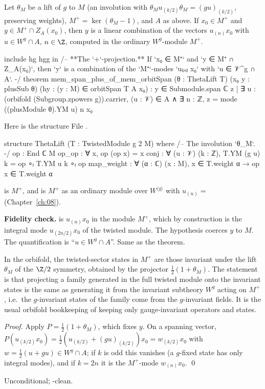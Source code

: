 \begin{theorem}\label{ch11:thm:plusproj}
Let $\theta_M$ be a lift of $g$ to $M$ (an involution with $\theta_M u_{(k/2)}\theta_M=(gu)_{(k/2)}$,
preserving weights), $M^+=\ker(\theta_M-1)$, and $A$ as above.  If $x_0\in M^+$ and $y\in M^+\cap
Z_A(x_0)$, then $y$ is a linear combination of the vectors $u_{(n)}x_0$ with $u\in W^g\cap A$, $n\in\Z$,
computed in the ordinary $W^g$-module $M^+$.
\end{theorem}
\begin{leancode}
include hg hgg in
/-- **The `+`-projection.**  If `x₀ ∈ M⁺` and `y ∈ M⁺ ∩ Z_A(x₀)`, then `y` is a combination of
the `M⁺`-modes `u₍ₙ₎ x₀` with `u ∈ 𝒱^g ∩ A`. -/
theorem mem_span_plus_of_mem_orbitSpan (θ : ThetaLift T) (x₀ y : plusSub θ)
    (hy : (y : M) ∈ orbitSpan T A x₀) :
    y ∈ Submodule.span ℂ {z | ∃ u : (orbifold (Subgroup.zpowers g)).carrier, (u : 𝒱) ∈ A ∧
      ∃ n : ℤ, z = mode ((plusModule θ).YM u) n x₀}
\end{leancode}
Here  is the structure
\noindent File .
\begin{leancode}
structure ThetaLift (T : TwistedModule g 2 M) where
  /-- The involution `θ_M`. -/
  op : End ℂ M
  op_op : ∀ x, op (op x) = x
  conj : ∀ (u : 𝒱) (k : ℤ), T.YM (g u) k = op ∘ₗ T.YM u k ∘ₗ op
  map_weight : ∀ (α : ℂ) (x : M), x ∈ T.weight α → op x ∈ T.weight α
\end{leancode}
 is $M^+$, and  is $M^+$ as
an ordinary module over $W^{\langle g\rangle}$ with $u_{(n)}=$  (Chapter~\ref{ch:08}).
\begin{dictionary}
\textbf{Fidelity check.}   is $u_{(n)}x_0$ in the module
$M^+$, which by construction is the integral mode $u_{(2n/2)}x_0$ of the twisted module.  The
hypothesis  coerces $y$ to $M$.  The quantification  is ``$u\in W^g\cap A$''.  Same as the theorem.
\end{dictionary}

\begin{physics}
In the orbifold, the twisted-sector states in $M^+$ are those invariant under the lift $\theta_M$ of the $\Z/2$ symmetry, obtained by the projector $\tfrac12(1+\theta_M)$. The statement is that projecting a family generated in the full twisted module onto the invariant states is the same as generating it from the invariant subtheory $W^g$ acting on $M^+$, i.e.\ the $g$-invariant states of the family come from the $g$-invariant fields. It is the usual orbifold bookkeeping of keeping only gauge-invariant operators and states.
\end{physics}
\emph{Proof.}  Apply $P=\tfrac12(1+\theta_M)$, which fixes $y$.  On a spanning vector,
$P(u_{(k/2)}x_0)=\tfrac12(u_{(k/2)}+(gu)_{(k/2)})x_0=w_{(k/2)}x_0$ with $w=\tfrac12(u+gu)\in W^g\cap A$;
if $k$ is odd this vanishes (a $g$-fixed state has only integral modes), and if $k=2n$ it is the
$M^+$-mode $w_{(n)}x_0$. \qed
\begin{status}Unconditional; -clean.\end{status}

